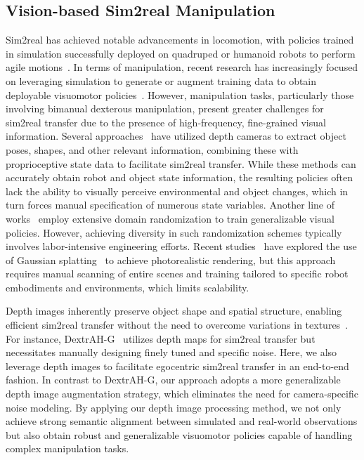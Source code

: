 \subsection{Vision-based Sim2real Manipulation}
Sim2real has achieved notable advancements in locomotion, with policies trained in simulation successfully deployed on quadruped or humanoid robots to perform agile motions~\cite{zhuang2023robot,zhuanghumanoid,rudin2025parkour,allshire2025visual,lei2024unio,qi2023hand}. In terms of manipulation, recent research has increasingly focused on leveraging simulation to generate or augment training data to obtain deployable visuomotor policies~\cite{wang2024cyberdemo,maddukuri2025sim,yuanlearning,huagensim2,wanggensim,xu2025dexsingrasplearningunifiedpolicy,zhang2025robustdexgrasp}. 
However, manipulation tasks, particularly those involving bimanual dexterous manipulation, present greater challenges for sim2real transfer due to the presence of high-frequency, fine-grained visual information.
Several approaches~\cite{lin2024learning,lin2024twisting,chen2023sequential,lin2025sim} have utilized depth cameras to extract object poses, shapes, and other relevant information, combining these with proprioceptive state data to facilitate sim2real transfer. While these methods can accurately obtain robot and object state information, the resulting policies often lack the ability to visually perceive environmental and object changes, which in turn forces manual specification of numerous state variables. Another line of works~\cite{yuanlearning,bjorck2025gr00t,singh2024dextrah} employ extensive domain randomization to train generalizable visual policies. However, achieving diversity in such randomization schemes typically involves labor-intensive engineering efforts. Recent studies~\cite{qureshi2024splatsim,li2024robogsim} have explored the use of Gaussian splatting~\cite{kerbl20233d} to achieve photorealistic rendering, but this approach requires manual scanning of entire scenes and training tailored to specific robot embodiments and environments, which limits scalability. 

Depth images inherently preserve object shape and spatial structure, enabling efficient sim2real transfer without the need to overcome variations in textures~\cite{dalal2024local,lumdextrah}. For instance, DextrAH-G~\cite{lumdextrah} utilizes depth maps for sim2real transfer but necessitates manually designing finely tuned and specific noise. Here, we also leverage depth images to facilitate egocentric sim2real transfer in an end-to-end fashion. In contrast to DextrAH-G, our approach adopts a more generalizable depth image augmentation strategy, which eliminates the need for camera-specific noise modeling. By applying our depth image processing method, we not only achieve strong semantic alignment between simulated and real-world observations but also obtain robust and generalizable visuomotor policies capable of handling complex manipulation tasks.



